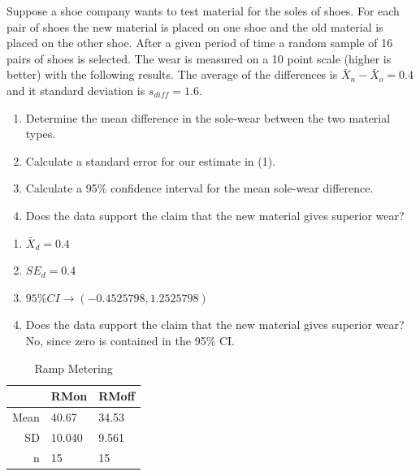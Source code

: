 \documentclass[11pt, chapterprefix=true]{scrbook}\usepackage[]{graphicx}\usepackage[]{color}
\begin{document}
\begin{exercises}
\begin{solution}
\end{solution}

\begin{exercise}  %

Suppose a shoe company wants to test material for the soles of shoes.  For each pair of shoes the new material is placed on one shoe and the old material is placed on the other shoe.  After a given period of time a random sample of 16 pairs of shoes is selected.  The wear is measured on a 10 point scale (higher is better) with the following results.  The average of the differences is $\bar{X}_n - \bar{X}_o = 0.4$ and it standard deviation is $s_{diff} = 1.6$.

\begin{enumerate}
  \item Determine the mean difference in the sole-wear between the two material \\ types.        
  \item Calculate a standard error for our estimate in (1).
  \item Calculate a 95\% confidence interval for the mean sole-wear difference.
  \item Does the data support the claim that the new material gives superior wear?
\end{enumerate}

\end{exercise}
\begin{solution}  %



\begin{enumerate}
  \item $\bar{X}_d = 0.4 $     
  \item $SE_d = 0.4$
  \item $95\% CI  \rightarrow ( -0.4525798, 1.2525798 )$
  \item Does the data support the claim that the new material gives superior wear?  No, since zero is contained in the 95\% CI.
\end{enumerate}

\end{solution}

\begin{exercise}   %

\begin{table}[ht]
\centering
\begin{tabular}{rll}
  \hline
 & RMon & RMoff \\ 
  \hline
Mean & 40.67 & 34.53 \\ 
  SD & 10.040 & 9.561 \\ 
  n & 15 & 15 \\ 
   \hline
\end{tabular}
\caption{Ramp Metering} 
\end{table}



\end{exercise}
\end{exercises}
\end{document}
